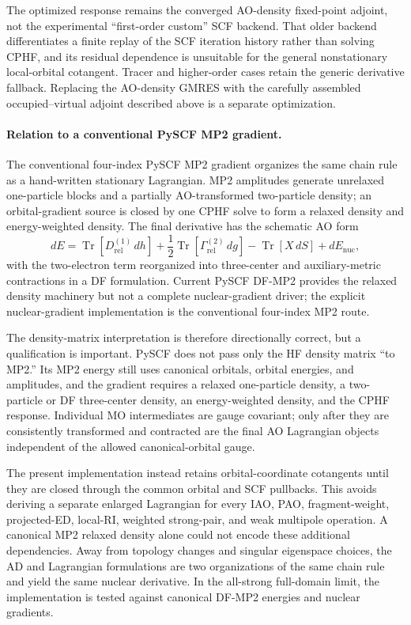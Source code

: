 \documentclass[11pt]{article}
\begin{document}
The optimized response remains the converged AO-density fixed-point adjoint,
not the experimental ``first-order custom'' SCF backend.  That older backend
differentiates a finite replay of the SCF iteration history rather than
solving CPHF, and its residual dependence is unsuitable for the general
nonstationary local-orbital cotangent.  Tracer and higher-order cases retain
the generic derivative fallback.  Replacing the AO-density GMRES with the
carefully assembled occupied--virtual adjoint described above is a separate
optimization.

\paragraph{Relation to a conventional PySCF MP2 gradient.}
The conventional four-index PySCF MP2 gradient \cite{sun2018} organizes the same chain rule
as a hand-written stationary Lagrangian.  MP2 amplitudes generate unrelaxed
one-particle blocks and a partially AO-transformed two-particle density; an
orbital-gradient source is closed by one CPHF solve to form a relaxed density
and energy-weighted density.  The final derivative has the schematic AO form
\begin{equation}
 dE=\operatorname{Tr}[D_{\mathrm{rel}}^{(1)}\,dh]
   +\frac12\operatorname{Tr}[\Gamma_{\mathrm{rel}}^{(2)}\,dg]
   -\operatorname{Tr}[X\,dS]+dE_{\mathrm{nuc}},
 \label{eq:conventional-mp2-gradient}
\end{equation}
with the two-electron term reorganized into three-center and auxiliary-metric
contractions in a DF formulation.  Current PySCF DF-MP2 provides the relaxed
density machinery but not a complete nuclear-gradient driver; the explicit
nuclear-gradient implementation is the conventional four-index MP2 route.

The density-matrix interpretation is therefore directionally correct,
but a qualification is important.  PySCF does not pass only the HF density
matrix ``to MP2.''  Its MP2 energy still uses canonical orbitals, orbital
energies, and amplitudes, and the gradient requires a relaxed one-particle
density, a two-particle or DF three-center density, an energy-weighted density,
and the CPHF response.  Individual MO intermediates are gauge covariant; only
after they are consistently transformed and contracted are the final AO
Lagrangian objects independent of the allowed canonical-orbital gauge.

The present implementation instead retains orbital-coordinate cotangents
until they are closed through the common orbital and SCF pullbacks.  This
avoids deriving a separate enlarged Lagrangian for every IAO, PAO,
fragment-weight, projected-ED, local-RI, weighted strong-pair, and weak
multipole operation.  A canonical MP2 relaxed density alone could not encode
these additional dependencies.  Away from topology changes and singular
eigenspace choices, the AD and Lagrangian formulations are two organizations
of the same chain rule and yield the same nuclear derivative.  In the
all-strong full-domain limit, the implementation is tested against canonical
DF-MP2 energies and nuclear gradients.
\end{document}
